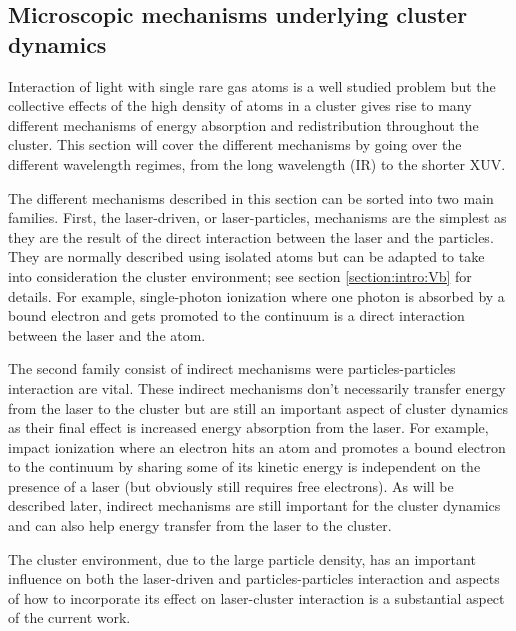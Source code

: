 

\subsection{Microscopic mechanisms underlying cluster dynamics}
\label{section:intro:mechanisms}

Interaction of light with single rare gas atoms is a well studied problem but
the collective effects of the high density of atoms in a cluster gives rise to
many different mechanisms of energy absorption and redistribution throughout the
cluster. This section will cover the different mechanisms by going over the
different wavelength regimes, from the long wavelength (IR) to the shorter XUV.

The different mechanisms described in this section can be sorted into two main
families. First, the laser-driven, or laser-particles, mechanisms are the
simplest as they are the result of the direct interaction between the laser
and the particles. They are normally described using isolated atoms but can
be adapted to take into consideration the cluster environment; see section
\ref{section:intro:Vb} for details. For example, single-photon ionization where
one photon is absorbed by a bound electron and gets promoted to the continuum is
a direct interaction between the laser and the atom.

The second family consist of indirect mechanisms were particles-particles
interaction are vital. These indirect mechanisms don't necessarily transfer
energy from the laser to the cluster but are still an important aspect of
cluster dynamics as their final effect is increased energy absorption from the
laser.
For example, impact ionization where
an electron hits an atom and promotes a bound electron to the continuum by
sharing some of its kinetic energy is independent on the presence of a laser
(but obviously still requires free electrons). As will be described later,
indirect mechanisms are still important for the cluster dynamics and can also
help energy transfer from the laser to the cluster.

The cluster environment, due to the large particle density, has an important
influence on both the laser-driven and particles-particles interaction and
aspects of how to incorporate its effect on laser-cluster interaction
is a substantial aspect of the current work.


